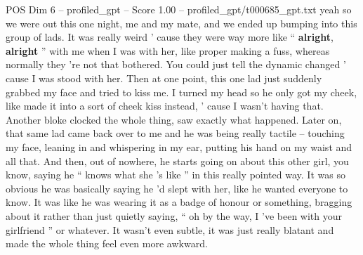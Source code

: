 \begin{textsample}{POS Dim 6 – profiled\_gpt – Score 1.00 – profiled\_gpt/t000685\_gpt.txt}  \label{ex:f6_pos_034}
yeah so we were out this one night, me and my mate, and we ended up bumping into this group of lads.
It was really weird ’ cause they were way more like “ \textbf{alright}, \textbf{alright} ” with me when I was with her, like proper making a fuss, whereas normally they ’re not that bothered.
You could just tell the dynamic changed ’ cause I was stood with her.
Then at one point, this one lad just suddenly grabbed my face and tried to kiss me.
I turned my head so he only got my cheek, like made it into a sort of cheek kiss instead, ’ cause I wasn't having that.
Another bloke clocked the whole thing, saw exactly what happened.
Later on, that same lad came back over to me and he was being really tactile – touching my face, leaning in and whispering in my ear, putting his hand on my waist and all that.
And then, out of nowhere, he starts going on about this other girl, you know, saying he “ knows what she ’s like ” in this really pointed way.
It was so obvious he was basically saying he ’d slept with her, like he wanted everyone to know.
It was like he was wearing it as a badge of honour or something, bragging about it rather than just quietly saying, “ oh by the way, I ’ve been with your girlfriend ” or whatever.
It wasn't even subtle, it was just really blatant and made the whole thing feel even more awkward.

\end{textsample}
